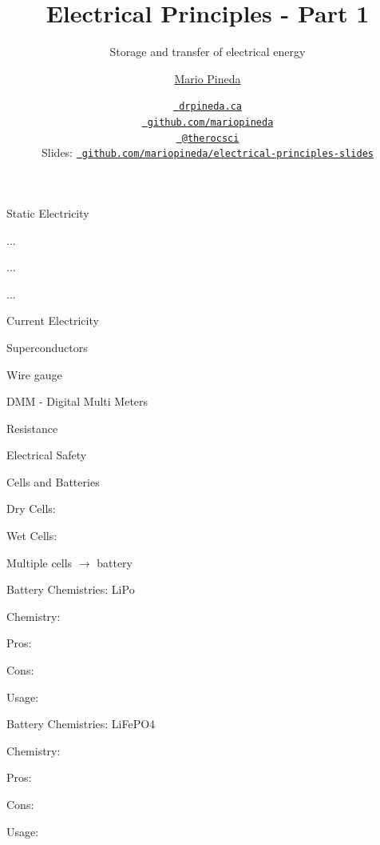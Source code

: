 \documentclass[12pt,t]{beamer}
\title{Electrical Principles - Part 1}
\subtitle{Storage and transfer of electrical energy}
\author{\href{www.drpineda.ca}{Mario Pineda}}
\institute{Queen Elizabeth High School}
\date{\href{www.drpineda.ca}{\tt \scriptsize \color{foreground} drpineda.ca}
\\[-4pt]
\href{https://github.com/mariopineda}{\tt \scriptsize \color{foreground} github.com/mariopineda}
\\[-4pt]
\href{https://twitter.com/therocsci}{\tt \scriptsize \color{foreground} @therocsci}
\\[2pt]
\scriptsize {\lolit Slides:} \href{https://github.com/mariopineda/electrical-principles-slides}{\tt \scriptsize
  \color{foreground} github.com/mariopineda/electrical-principles-slides}
}
\begin{document}
{
}

\begin{frame}[c]{Static Electricity}
\vspace{-20mm}
\bbi
\item ... 
\item ...
\item ...
\ei
\end{frame}

\begin{frame}[c]{Current Electricity}
\vspace{-20mm}
\bbi
\item Superconductors
\item Wire gauge
\item DMM - Digital Multi Meters 
\item Resistance
\ei
\end{frame}

\begin{frame}[c]{Electrical Safety}

\end{frame}

\begin{frame}[c]{Cells and Batteries}
\bbi
\item Dry Cells: 
\item Wet Cells:
\item Multiple cells $\longrightarrow$ battery
\ei
\end{frame}

\begin{frame}[c]{Battery Chemistries: LiPo }
\bbi
\item Chemistry:
\item Pros: 
\item Cons:
\item Usage:
\ei
\end{frame}

\begin{frame}[c]{Battery Chemistries: LiFePO4 }
\bbi    
\item Chemistry:
\item Pros:     
\item Cons:
\item Usage:
\ei     
\end{frame}
\end{document}
